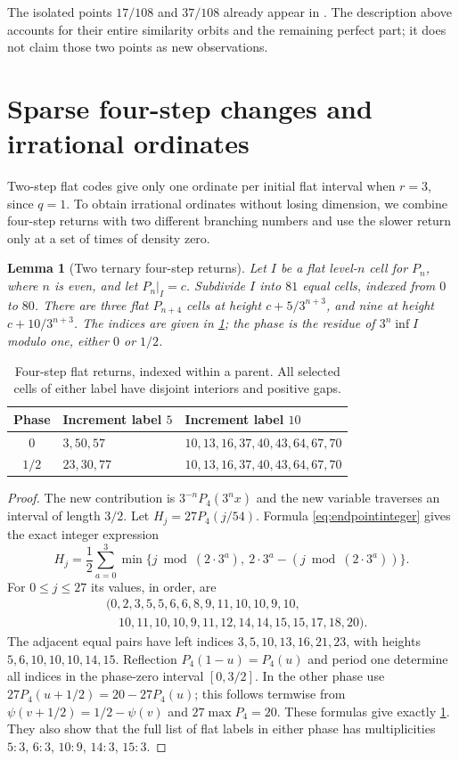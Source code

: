 \documentclass[11pt]{article}
\newtheorem{lemma}[theorem]{Lemma}
\theoremstyle{definition}
\theoremstyle{remark}
\begin{document}
The isolated points $17/108$ and $37/108$ already appear in
\cite[Remark~4.7]{allaartlevels}. The description above accounts for their
entire similarity orbits and the remaining perfect part; it does not
claim those two points as new observations.

\section{Sparse four-step changes and irrational ordinates}\label{sec:sparse}
Two-step flat codes give only one ordinate per initial flat interval when
$r=3$, since $q=1$. To obtain irrational ordinates without losing
dimension, we combine four-step returns with two different branching
numbers and use the slower return only at a set of times of density zero.

\begin{lemma}[Two ternary four-step returns]\label{lem:fourstep}
Let $I$ be a flat level-$n$ cell for $P_n$, where $n$ is even, and let
$P_n|_I=c$. Subdivide $I$ into $81$ equal cells, indexed from $0$ to $80$.
There are three flat $P_{n+4}$ cells at height $c+5/3^{n+3}$, and nine
at height $c+10/3^{n+3}$. The indices are given in \cref{tab:blocks};
the phase is the residue of $3^n\inf I$ modulo one, either $0$ or $1/2$.
\end{lemma}
\begin{table}[tb]
\centering
\begin{tabular}{@{}cll@{}}
\toprule
Phase & Increment label $5$ & Increment label $10$\\
\midrule
$0$ & $3,50,57$ & $10,13,16,37,40,43,64,67,70$\\
$1/2$ & $23,30,77$ & $10,13,16,37,40,43,64,67,70$\\
\bottomrule
\end{tabular}
\caption{Four-step flat returns, indexed within a parent. All selected
cells of either label have disjoint interiors and positive gaps.}
\label{tab:blocks}
\end{table}
\begin{proof}
The new contribution is $3^{-n}P_4(3^nx)$ and the new variable traverses
an interval of length $3/2$. Let $H_j=27P_4(j/54)$. Formula
\cref{eq:endpointinteger} gives the exact integer expression
\[
 H_j=\frac12\sum_{a=0}^3
 \min\{j\bmod(2\cdot3^a),\ 2\cdot3^a-(j\bmod(2\cdot3^a))\}.
\]
For $0\le j\le27$ its values, in order, are
\begin{align*}
 &(0,2,3,5,5,6,6,8,9,11,10,10,9,10,\\
 &\hspace{12pt}10,11,10,10,9,11,12,14,14,15,15,17,18,20).
\end{align*}
The adjacent equal pairs have left indices
$3,5,10,13,16,21,23$, with heights $5,6,10,10,10,14,15$.
Reflection $P_4(1-u)=P_4(u)$ and period one determine all indices in
the phase-zero interval $[0,3/2]$. In the other phase use
$27P_4(u+1/2)=20-27P_4(u)$; this follows termwise from
$\psi(v+1/2)=1/2-\psi(v)$ and $27\max P_4=20$.
These formulas give exactly \cref{tab:blocks}.
They also show that the full list of flat labels in either phase has
multiplicities $5:3$, $6:3$, $10:9$, $14:3$, $15:3$.
\end{proof}
\end{document}
